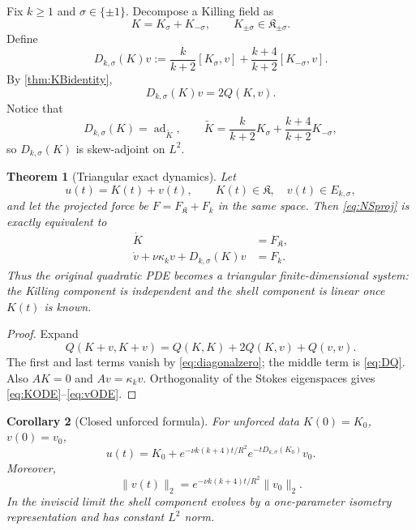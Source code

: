 \documentclass[
 aps,
 prd,
 reprint,
 amsmath,
 amssymb,
 nofootinbib,
 superscriptaddress
]{revtex4-2}
\newtheorem{theorem}{Theorem}[section]
\newtheorem{corollary}[theorem]{Corollary}
\theoremstyle{definition}
\theoremstyle{remark}
\newcommand{\cK}{\mathfrak K}
\newcommand{\ad}{\operatorname{ad}}
\begin{document}
Fix $k\ge1$ and $\sigma\in\{\pm1\}$.  Decompose a Killing field as
\[
 K=K_\sigma+K_{-\sigma},
 \qquad
 K_{\pm\sigma}\in\cK_{\pm\sigma}.
\]
Define
\begin{equation}
 D_{k,\sigma}(K)v
 :=
 \frac{k}{k+2}[K_\sigma,v]
 +
 \frac{k+4}{k+2}[K_{-\sigma},v].
 \label{eq:Ddef}
\end{equation}
By \cref{thm:KBidentity},
\begin{equation}
 D_{k,\sigma}(K)v=2Q(K,v).
 \label{eq:DQ}
\end{equation}
Notice that
\[
 D_{k,\sigma}(K)=
 \ad_{\widetilde K},
 \qquad
 \widetilde K=
 \frac{k}{k+2}K_\sigma+
 \frac{k+4}{k+2}K_{-\sigma},
\]
so $D_{k,\sigma}(K)$ is skew-adjoint on $L^2$.

\begin{theorem}[Triangular exact dynamics]
\label{thm:triangular}
Let
\[
 u(t)=K(t)+v(t),
 \qquad K(t)\in\cK,\quad v(t)\in E_{k,\sigma},
\]
and let the projected force be
$F=F_{\cK}+F_k$ in the same space.  Then \eqref{eq:NSproj} is exactly
equivalent to
\begin{align}
 \dot K&=F_{\cK},
 \label{eq:KODE}\\
 \dot v+\nu\kappa_k v+D_{k,\sigma}(K)v&=F_k.
 \label{eq:vODE}
\end{align}
Thus the original quadratic PDE becomes a triangular finite-dimensional
system: the Killing component is independent and the shell component is
linear once $K(t)$ is known.
\end{theorem}

\begin{proof}
Expand
\[
 Q(K+v,K+v)=Q(K,K)+2Q(K,v)+Q(v,v).
\]
The first and last terms vanish by \eqref{eq:diagonalzero}; the middle term
is \eqref{eq:DQ}.  Also $AK=0$ and $Av=\kappa_kv$.
Orthogonality of the Stokes eigenspaces gives
\eqref{eq:KODE}--\eqref{eq:vODE}.
\end{proof}

\begin{corollary}[Closed unforced formula]
For unforced data $K(0)=K_0$, $v(0)=v_0$,
\begin{equation}
 \boxed{
 u(t)=
 K_0+
 e^{-\nu k(k+4)t/R^2}
 e^{-tD_{k,\sigma}(K_0)}v_0.
 }
 \label{eq:exactsolution}
\end{equation}
Moreover,
\begin{equation}
 \boxed{
 \|v(t)\|_2=
 e^{-\nu k(k+4)t/R^2}\|v_0\|_2.
 }
 \label{eq:vdecay}
\end{equation}
In the inviscid limit the shell component evolves by a one-parameter
isometry representation and has constant $L^2$ norm.
\end{corollary}
\end{document}
